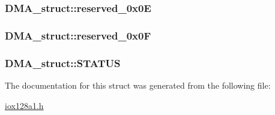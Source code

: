 \label{struct_d_m_a__struct_a7f2b78187e1c457b48f3abd58e10a023}
\hypertarget{struct_d_m_a__struct_a61634ebe46621085791176e247ca9544}{
\subsubsection[{reserved\_\-0x0E}]{ {\bf DMA\_\-struct::reserved\_\-0x0E}}}
\label{struct_d_m_a__struct_a61634ebe46621085791176e247ca9544}
\hypertarget{struct_d_m_a__struct_a32180aac4f6c70dbaffdba04c73c7395}{
\subsubsection[{reserved\_\-0x0F}]{ {\bf DMA\_\-struct::reserved\_\-0x0F}}}
\label{struct_d_m_a__struct_a32180aac4f6c70dbaffdba04c73c7395}
\hypertarget{struct_d_m_a__struct_a52fe93508d8e4b830ea4a2acc3c8bae8}{
\subsubsection[{STATUS}]{ {\bf DMA\_\-struct::STATUS}}}
\label{struct_d_m_a__struct_a52fe93508d8e4b830ea4a2acc3c8bae8}


The documentation for this struct was generated from the following file:\begin{DoxyCompactItemize}
\item 
\hyperlink{iox128a1_8h}{iox128a1.h}\end{DoxyCompactItemize}
